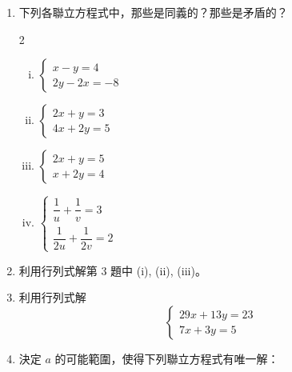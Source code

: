 \begin{enumerate}[1.]
\begin{multicols}{2}
\begin{enumerate}[(i)]
    \item $\begin{vmatrix} 2 & 9 \\ -6 & -18 \end{vmatrix}$
    \item $\begin{vmatrix} 12 & -1 \\ 1 & 11 \end{vmatrix}$
    \item $\begin{vmatrix} 2 & 8 \\ 0 & 1 \end{vmatrix}$
  \end{enumerate}
  \end{multicols}
  \item 下列各聯立方程式中，那些是同義的？那些是矛盾的？
  \begin{multicols}{2}
  \begin{enumerate}[(i)]
    \item $\begin{cases} x-y = 4 \\ 2y-2x = -8 \end{cases}$
    \item $\begin{cases} 2x+y = 3 \\ 4x+2y = 5 \end{cases}$
    \item $\begin{cases} 2x+y = 5 \\ x+2y = 4 \end{cases}$
    \item $\begin{cases} \dfrac{1}{u} + \dfrac{1}{v} = 3 \\[1em] \dfrac{1}{2u} + \dfrac{1}{2v} = 2 \end{cases}$
  \end{enumerate}
  \end{multicols}
  \item 利用行列式解第 3 題中 (i), (ii), (iii)。
  \item 利用行列式解
  \begin{equation*}
  \begin{cases}
    29x + 13y = 23 \\
    7x + 3y = 5
  \end{cases}
  \end{equation*}
  \item 決定 $a$ 的可能範圍，使得下列聯立方程式有唯一解：
  \begin{equation*}

\end{equation*}
\end{enumerate}
